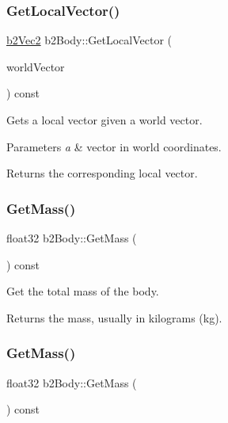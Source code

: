 \subsubsection{\texorpdfstring{Get\+Local\+Vector()}{GetLocalVector()}\hspace{0.1cm}{\footnotesize\ttfamily [2/2]}}
{\footnotesize\ttfamily \hyperlink{structb2Vec2}{b2\+Vec2} b2\+Body\+::\+Get\+Local\+Vector (\begin{DoxyParamCaption}\item[{const \hyperlink{structb2Vec2}{b2\+Vec2} \&}]{world\+Vector }\end{DoxyParamCaption}) const}

Gets a local vector given a world vector. 
\begin{DoxyParams}{Parameters}
{\em a} & vector in world coordinates. \\
\hline
\end{DoxyParams}
\begin{DoxyReturn}{Returns}
the corresponding local vector. 
\end{DoxyReturn}
\mbox{\label{classb2Body_adfeebf45965d131894f728a2f264311d}} 
\subsubsection{\texorpdfstring{Get\+Mass()}{GetMass()}\hspace{0.1cm}{\footnotesize\ttfamily [1/2]}}
{\footnotesize\ttfamily float32 b2\+Body\+::\+Get\+Mass (\begin{DoxyParamCaption}{ }\end{DoxyParamCaption}) const\hspace{0.3cm}{\ttfamily [inline]}}

Get the total mass of the body. \begin{DoxyReturn}{Returns}
the mass, usually in kilograms (kg). 
\end{DoxyReturn}
\mbox{\label{classb2Body_adfeebf45965d131894f728a2f264311d}} 
\subsubsection{\texorpdfstring{Get\+Mass()}{GetMass()}\hspace{0.1cm}{\footnotesize\ttfamily [2/2]}}
{\footnotesize\ttfamily float32 b2\+Body\+::\+Get\+Mass (\begin{DoxyParamCaption}{ }\end{DoxyParamCaption}) const}


